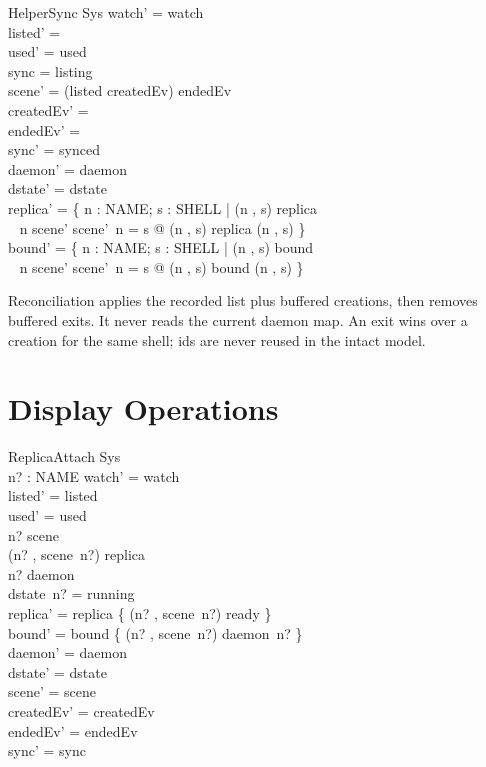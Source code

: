 \documentclass[a4paper,10pt,fleqn]{article}
\begin{document}
\begin{schema}{HelperSync}
  \Delta Sys
\where
  watch' = watch \\
  listed' = \emptyset \\
  used' = used \\
  sync = listing \\
  scene' = (listed \cup createdEv) \setminus endedEv \\
  createdEv' = \emptyset \\
  endedEv' = \emptyset \\
  sync' = synced \\
  daemon' = daemon \\
  dstate' = dstate \\
  replica' = \{ n : NAME; s : SHELL | (n , s) \in \dom replica \\
    \quad~ \land n \in \dom scene' \land scene'~n = s @ (n , s) \mapsto replica (n , s) \} \\
  bound' = \{ n : NAME; s : SHELL | (n , s) \in \dom bound \\
    \quad~ \land n \in \dom scene' \land scene'~n = s @ (n , s) \mapsto bound (n , s) \}
\end{schema}

Reconciliation applies the recorded list plus buffered creations, then
removes buffered exits. It never reads the current daemon map. An exit wins
over a creation for the same shell; ids are never reused in the intact model.

\section{Display Operations}

\begin{schema}{ReplicaAttach}
  \Delta Sys \\
  n? : NAME
\where
  watch' = watch \\
  listed' = listed \\
  used' = used \\
  n? \in \dom scene \\
  (n? , scene~n?) \notin \dom replica \\
  n? \in \dom daemon \\
  dstate~n? = running \\
  replica' = replica \cup \{ (n? , scene~n?) \mapsto ready \} \\
  bound' = bound \cup \{ (n? , scene~n?) \mapsto daemon~n? \} \\
  daemon' = daemon \\
  dstate' = dstate \\
  scene' = scene \\
  createdEv' = createdEv \\
  endedEv' = endedEv \\
  sync' = sync
\end{schema}
\end{document}
